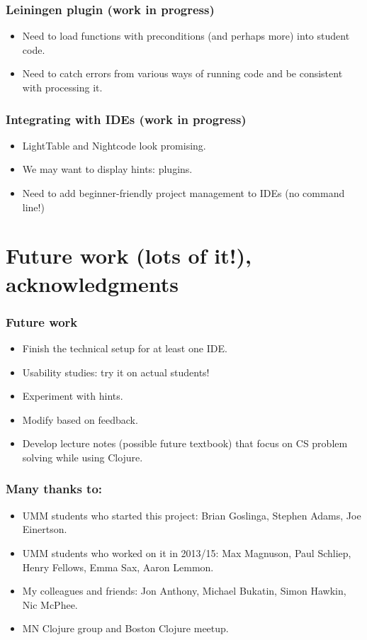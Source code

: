 \documentclass{beamer}
\begin{document}
\begin{frame}
   \frametitle{Leiningen plugin (work in progress)}
\begin{itemize}
\item Need to load functions with preconditions (and perhaps more) into student code. 
\item Need to catch errors from various ways of running code and be consistent with processing it.
\end{itemize}
\end{frame}

\begin{frame}
   \frametitle{Integrating with IDEs (work in progress)}
\begin{itemize}
\item LightTable and Nightcode look promising.
\item We may want to display hints: plugins. 
\item Need to add beginner-friendly project management to IDEs (no command line!)
\end{itemize}
\end{frame}

\section{Future work (lots of it!), acknowledgments}

\begin{frame}
   \frametitle{Future work}
\begin{itemize}
\item Finish the technical setup for at least one IDE.
\item Usability studies: try it on actual students!
\item Experiment with hints. 
\item Modify based on feedback. 
\item Develop lecture notes (possible future textbook) that focus on CS problem solving while using Clojure. 
\end{itemize}
\end{frame}

\begin{frame}
   \frametitle{Many thanks to:}
\begin{itemize}
\item UMM students who started this project: Brian Goslinga, Stephen Adams, Joe Einertson. 
\item UMM students who worked on it in 2013/15: Max Magnuson, Paul Schliep, Henry Fellows, Emma Sax, Aaron Lemmon. 
\item My colleagues and friends: Jon Anthony, Michael Bukatin, Simon Hawkin, Nic McPhee. 
\item MN Clojure group and Boston Clojure meetup. 
\end{itemize}
\end{frame}
\end{document}
